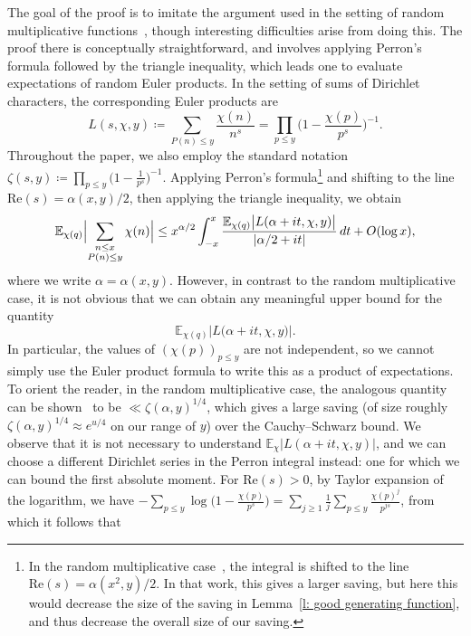 \documentclass[a4paper,12pt,reqno]{amsart}
\newcommand{\E}{\mathbb{E}}
\begin{document}
The goal of the proof is to imitate the argument used in the setting of random multiplicative functions~\cite[Theorem~1.2]{HardyXu}, though interesting difficulties arise from doing this. The proof there is conceptually straightforward, and involves applying Perron's formula followed by the triangle inequality, which leads one to evaluate expectations of random Euler products. In the setting of sums of Dirichlet characters, the corresponding Euler products are
\[
L (s, \chi, y) \coloneqq \sum_{P(n) \leq y} \frac{\chi(n)}{n^{s}} = \prod_{p \leq y} \biggl( 1 - \frac{\chi (p)}{p^{s}} \biggr)^{-1} .
\]
Throughout the paper, we also employ the standard notation $\zeta (s, y) \coloneqq \prod_{p \leq y} \bigl( 1 - \frac{1}{p^{s}} \bigr)^{-1}$. Applying Perron's formula\footnote{In the random multiplicative case~\cite[Section~4]{HardyXu}, the integral is shifted to the line $\mathrm{Re} (s) = \alpha (x^2, y) / 2$. In that work, this gives a larger saving, but here this would decrease the size of the saving in Lemma~\ref{l: good generating function}, and thus decrease the overall size of our saving.} and shifting to the line $\mathrm{Re} (s) = \alpha(x,y) /2$, then applying the triangle inequality, we obtain
\[
\E_{\chi (q)} \Bigl| \sum_{\substack{n \leq x \\ P(n) \leq y}} \chi(n) \Bigr| \leq x^{\alpha/2} \int_{-x}^{x} \frac{\E_{\chi (q) } \bigl| L ( \alpha + it, \chi, y ) \bigr|}{|\alpha/2+it|} \, dt + O(\log x),
\]
where we write $\alpha = \alpha (x,y)$. However, in contrast to the random multiplicative case, it is not obvious that we can obtain any meaningful upper bound for the quantity
\[
\E_{\chi(q)} \bigl| L \bigl( \alpha + it, \chi, y \bigr) \bigr|.
\]
In particular, the values of $(\chi(p))_{p \leq y}$ are not independent, so we cannot simply use the Euler product formula to write this as a product of expectations. To orient the reader, in the random multiplicative case, the analogous quantity can be shown~\cite[Lemma~3.1]{HardyXu} to be $\ll \zeta(\alpha , y)^{1/4}$, which gives a large saving (of size roughly $\zeta(\alpha,y)^{1/4} \approx e^{u/4}$ on our range of $y$) over the Cauchy--Schwarz bound. We observe that it is not necessary to understand $\E_\chi | L ( \alpha + it, \chi, y )|$, and we can choose a different Dirichlet series in the Perron integral instead: one for which we can bound the first absolute moment. For $\mathrm{Re}(s) > 0$, by Taylor expansion of the logarithm, we have
$- \sum_{p \leq y} \log \bigl( 1 - \frac{\chi(p)}{p^{s}} \bigr) = \sum_{j \geq 1} \frac{1}{j} \sum_{p \leq y} \frac{\chi(p)^j}{p^{j s}}$, from which it follows that
\end{document}
